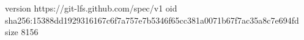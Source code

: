version https://git-lfs.github.com/spec/v1
oid sha256:15388dd1929316167c6f7a757e7b5346f65cc381a0071b67f7ac35a8c7e694fd
size 8156
